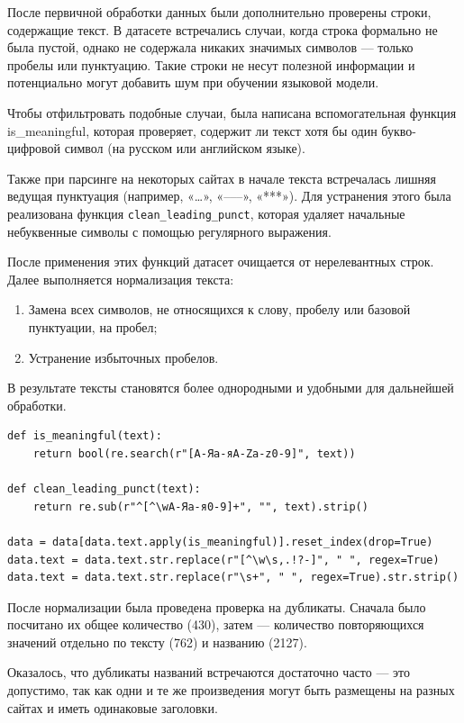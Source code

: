 \documentclass[coursework]{SCWorks}
\begin{document}
    После первичной обработки данных были дополнительно проверены строки, содержащие текст.
    В датасете встречались случаи, когда строка формально не была пустой, однако не содержала никаких значимых символов —
    только пробелы или пунктуацию.
    Такие строки не несут полезной информации и потенциально могут добавить шум при обучении языковой модели.

    Чтобы отфильтровать подобные случаи, была написана вспомогательная функция is\_meaningful, которая проверяет,
    содержит ли текст хотя бы один букво-цифровой символ (на русском или английском языке).

    Также при парсинге на некоторых сайтах в начале текста встречалась лишняя ведущая пунктуация (например, «…», «–––», «***»).
    Для устранения этого была реализована функция \texttt{clean\_leading\_punct}, которая удаляет начальные небуквенные символы с помощью
    регулярного выражения.

    После применения этих функций датасет очищается от нерелевантных строк.
    Далее выполняется нормализация текста:
    \begin{enumerate}
        \item Замена всех символов, не относящихся к слову, пробелу или базовой пунктуации, на пробел;
        \item Устранение избыточных пробелов.
    \end{enumerate}

    В результате тексты становятся более однородными и удобными для дальнейшей обработки.

    \begin{verbatim}
def is_meaningful(text):
    return bool(re.search(r"[А-Яа-яA-Za-z0-9]", text))

def clean_leading_punct(text):
    return re.sub(r"^[^\wА-Яа-я0-9]+", "", text).strip()

data = data[data.text.apply(is_meaningful)].reset_index(drop=True)
data.text = data.text.str.replace(r"[^\w\s,.!?-]", " ", regex=True)
data.text = data.text.str.replace(r"\s+", " ", regex=True).str.strip()
    \end{verbatim}

    После нормализации была проведена проверка на дубликаты.
    Сначала было посчитано их общее количество (430), затем — количество повторяющихся значений отдельно по тексту (762) и названию (2127).

    Оказалось, что дубликаты названий встречаются достаточно часто — это допустимо, так как одни и те же произведения
    могут быть размещены на разных сайтах и иметь одинаковые заголовки.
\end{document}
